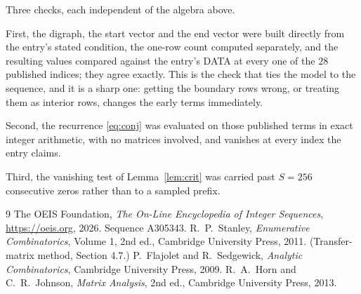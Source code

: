 \documentclass[11pt,a4paper]{article}
\theoremstyle{plain}
\theoremstyle{definition}
\begin{document}
Three checks, each independent of the algebra above.

First, the digraph, the start vector and the end vector were built directly from the
entry's stated condition, the one-row count computed separately, and the resulting values
compared against the entry's DATA at every one of the $28$ published indices; they
agree exactly. This is the check that ties the model to the sequence, and it is a sharp one:
getting the boundary rows wrong, or treating them as interior rows, changes the early terms
immediately.

Second, the recurrence \eqref{eq:conj} was evaluated on those published terms in exact
integer arithmetic, with no matrices involved, and vanishes at every index the entry claims.

Third, the vanishing test of Lemma~\ref{lem:crit} was carried past $S=256$ consecutive
zeros rather than to a sampled prefix.

\begin{thebibliography}{9}
 The OEIS Foundation, \emph{The On-Line Encyclopedia of Integer
Sequences}, \url{https://oeis.org}, 2026. Sequence A305343.
 R.~P.~Stanley, \emph{Enumerative Combinatorics}, Volume 1, 2nd ed.,
Cambridge University Press, 2011. (Transfer-matrix method, Section 4.7.)
 P.~Flajolet and R.~Sedgewick, \emph{Analytic Combinatorics}, Cambridge
University Press, 2009.
 R.~A.~Horn and C.~R.~Johnson, \emph{Matrix Analysis}, 2nd ed., Cambridge
University Press, 2013.
\end{thebibliography}
\end{document}
